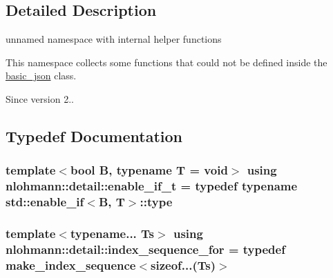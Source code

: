 \subsection{Detailed Description}
unnamed namespace with internal helper functions 

This namespace collects some functions that could not be defined inside the \hyperlink{classnlohmann_1_1basic__json}{basic\+\_\+json} class.

\begin{DoxySince}{Since}
version 2.. 
\end{DoxySince}


\subsection{Typedef Documentation}
\subsubsection[{\texorpdfstring{enable\+\_\+if\+\_\+t}{enable_if_t}}]{\setlength{\rightskip}{0pt plus 5cm}template$<$bool B, typename T  = void$>$ using {\bf nlohmann\+::detail\+::enable\+\_\+if\+\_\+t} = typedef typename std\+::enable\+\_\+if$<$B, T$>$\+::type}\hypertarget{namespacenlohmann_1_1detail_a02bcbc878bee413f25b985ada771aa9c}{}\label{namespacenlohmann_1_1detail_a02bcbc878bee413f25b985ada771aa9c}
\subsubsection[{\texorpdfstring{index\+\_\+sequence\+\_\+for}{index_sequence_for}}]{\setlength{\rightskip}{0pt plus 5cm}template$<$typename... Ts$>$ using {\bf nlohmann\+::detail\+::index\+\_\+sequence\+\_\+for} = typedef {\bf make\+\_\+index\+\_\+sequence}$<$sizeof...(Ts)$>$}\hypertarget{namespacenlohmann_1_1detail_a24800493c6ec02ce033dcbb47b7fd28e}{}\label{namespacenlohmann_1_1detail_a24800493c6ec02ce033dcbb47b7fd28e}
